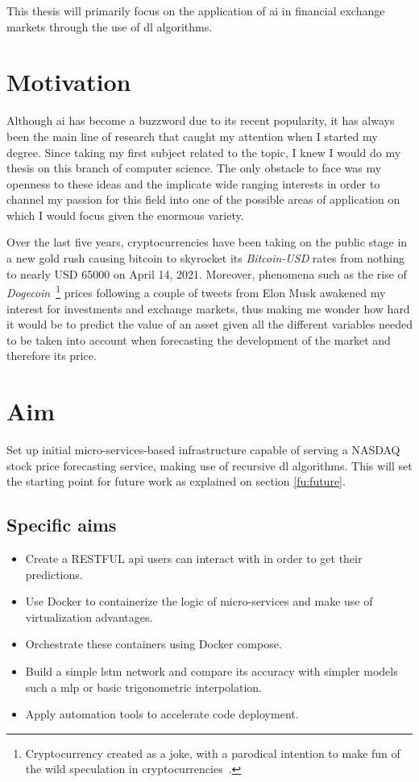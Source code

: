 This thesis will primarily focus on the application of \gls{ai} in financial exchange markets through the use of \gls{dl} algorithms.

\section{Motivation}

Although \gls{ai} has become a buzzword due to its recent popularity, it has always been the main line of research that caught my attention when I started my degree. Since taking my first subject related to the topic, I knew I would do my thesis on this branch of computer science. The only obstacle to face was my openness to these ideas and the implicate wide ranging interests in order to channel my passion for this field into one of the possible areas of application on which I would focus given the enormous variety. 

Over the last five years, cryptocurrencies have been taking on the public stage in a new gold rush causing bitcoin to skyrocket its \textit{Bitcoin-USD} rates from nothing to nearly USD 65000 on April 14, 2021. Moreover, phenomena such as the rise of \textit{Dogecoin}~\footnote{Cryptocurrency created as a joke, with a parodical intention to make fun of the wild speculation in cryptocurrencies~\cite{dogeDefinition}.} prices following a couple of tweets from Elon Musk awakened my interest for investments and exchange markets, thus making me wonder how hard it would be to predict the value of an asset given all the different variables needed to be taken into account when forecasting the development of the market and therefore its price.

\section{Aim}

Set up initial micro-services-based infrastructure capable of serving a NASDAQ stock price forecasting service, making use of recursive \gls{dl} algorithms. This will set the starting point for future work as explained on section \ref{fu:future}.

\newpage
\subsection{Specific aims}
\begin{itemize}
    \item Create a RESTFUL \gls{api} users can interact with in order to get their predictions.
    \item Use Docker to containerize the logic of micro-services and make use of virtualization advantages.
    \item Orchestrate these containers using Docker compose.
    \item Build a simple \gls{lstm} network and compare its accuracy with simpler models such a \gls{mlp} or basic trigonometric interpolation.
    \item Apply automation tools to accelerate code deployment.
\end{itemize}

